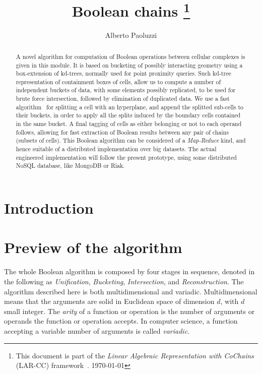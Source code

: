 \documentclass[11pt,oneside]{article}    %
\title{Boolean chains
\footnote{This document is part of the \emph{Linear Algebraic Representation with CoChains} (LAR-CC) framework~\cite{cclar-proj:2013:00}. \today}
}
\author{Alberto Paoluzzi}
\begin{document}
\maketitle
\nonstopmode

\begin{abstract}
A novel algorithm for computation of Boolean operations between cellular complexes is given in this module.
It is based on bucketing of possibly interacting geometry using a box-extension of kd-trees, normally used for  point proximity queries. 
Such kd-tree representation of containment boxes of cells, allow us to compute a number of independent buckets of data,  with some elements possibly replicated,  to be used for brute force intersection, followed by elimination of duplicated data.
We use a fast algorithm~\cite{Bajaj:1996:SCC:237218.237246} for splitting a cell with an hyperplane, and append the splitted sub-cells to their buckets, in order to apply all the splits induced by the boundary cells contained in the same bucket. 
A final tagging of cells as either belonging or not to each operand follows, allowing for fast extraction of Boolean results between any pair of chains (subsets of cells).
This Boolean algorithm can be considered of a \emph{Map-Reduce} kind, and hence suitable of a distributed implementation over big datasets. The actual engineered implementation will follow the present prototype, using some distributed NoSQL database, like MongoDB or Riak. 
\end{abstract}

\tableofcontents

\section{Introduction}


\section{Preview of the algorithm}

The whole Boolean algorithm is composed by four stages in sequence, denoted in the following as \emph{Unification}, \emph{Bucketing}, \emph{Intersection}, and \emph{Reconstruction}. The algorithm described here is both multidimensional and variadic. Multidimensional means that the arguments are solid in Euclidean space of dimension $d$, with $d$ small integer.
The \emph{arity}  of a function or operation is the number of arguments or operands the function or operation accepts. 
In computer science, a function accepting a variable number of arguments is called \emph{variadic}.
\end{document}
